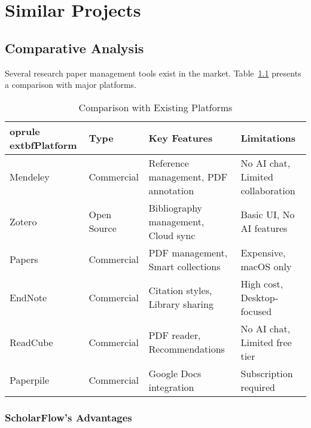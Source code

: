 \chapter{Similar Projects}
\label{ch:similar-projects}

\section{Comparative Analysis}
\label{sec:comparative-analysis}

Several research paper management tools exist in the market. Table~\ref{tab:competitors} presents a comparison with major platforms.

\begin{table}[H]
\centering
\caption{Comparison with Existing Platforms}
\label{tab:competitors}
\small
\setlength{\tabcolsep}{6pt}%
\renewcommand{\arraystretch}{1.15}%
\begin{tabularx}{\textwidth}{@{} l l >{\raggedright\arraybackslash}X >{\raggedright\arraybackslash}X @{} }
    	oprule
    	extbf{Platform} & \textbf{Type} & \textbf{Key Features} & \textbf{Limitations} \\
\midrule
Mendeley & Commercial & Reference management, PDF annotation & No AI chat, Limited collaboration \\
Zotero & Open Source & Bibliography management, Cloud sync & Basic UI, No AI features \\
Papers & Commercial & PDF management, Smart collections & Expensive, macOS only \\
EndNote & Commercial & Citation styles, Library sharing & High cost, Desktop-focused \\
ReadCube & Commercial & PDF reader, Recommendations & No AI chat, Limited free tier \\
Paperpile & Commercial & Google Docs integration & Subscription required \\
\bottomrule
\end{tabularx}
\end{table}

\subsection{ScholarFlow's Advantages}


